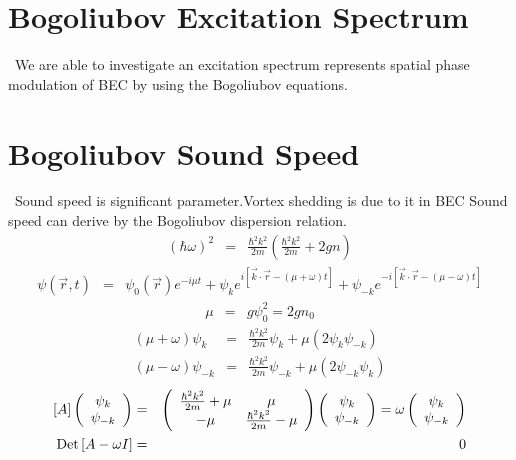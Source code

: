 \documentclass[12pt,a4paper]{jbook}
\begin{document}
\section{Bogoliubov Excitation Spectrum}
\ We are able to investigate an excitation spectrum represents spatial phase modulation of BEC
by using the Bogoliubov equations.

\section{Bogoliubov Sound Speed}
\ Sound speed is significant parameter.Vortex shedding is due to it in BEC
Sound speed can derive by the Bogoliubov dispersion relation.
\begin{eqnarray}
(\hbar \omega)^2 & = & \frac{\hbar^2 k^2}{2m} \left( \frac{\hbar^2 k^2}{2m} + 2 g n \right)
\end{eqnarray}
\begin{eqnarray}
\psi(\vec{r}, t) & = & \psi_0 (\vec{r}) e^{-i \mu t}
+ \psi_k e^{i \left[ \vec{k} \cdot \vec{r} - (\mu + \omega) t \right]}
+ \psi_{-k} e^{-i \left[ \vec{k} \cdot \vec{r} - (\mu - \omega) t \right]}
\end{eqnarray}
\begin{eqnarray}
\mu & = & g \psi^2_0 = 2gn_0
\end{eqnarray}
\begin{eqnarray}
(\mu + \omega) \psi_{k} & = & \frac{\hbar^2 k^2}{2m} \psi_{k} + \mu(2 \psi_{k} \psi_{-k} )
\\
(\mu - \omega) \psi_{-k} & = & \frac{\hbar^2 k^2}{2m} \psi_{-k} + \mu(2 \psi_{-k} \psi_k )
\end{eqnarray}
\begin{eqnarray}
\left[ A \right]
\left( \begin{array}{c} \psi_k \\ \psi_{-k} \end{array} \right)
& = &
\left( \begin{array}{c c}
\frac{\hbar^2 k^2}{2m} + \mu & \mu
\\
-\mu & \frac{\hbar^2 k^2}{2m} - \mu
\end{array} \right)
\left( \begin{array}{c} \psi_k \\ \psi_{-k} \end{array} \right)
=
\omega
\left( \begin{array}{c} \psi_k \\ \psi_{-k} \end{array} \right)
\\
{\rm Det} \left[A - \omega I \right] & = & 0
\end{eqnarray}
\fi %
\end{document}
